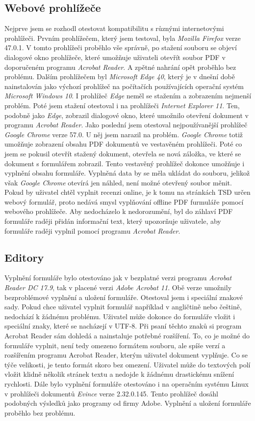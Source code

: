 \documentclass[czech,BP]{thesiskiv}
\begin{document}
\subsection{Webové prohlížeče}
Nejprve jsem se rozhodl otestovat kompatibilitu s různými internetovými prohlížeči. Prvním prohlížečem, který jsem testoval, byla \emph{Mozilla Firefox} verze 47.0.1. V tomto prohlížeči proběhlo vše správně, po stažení souboru se objeví dialogové okno prohlížeče, které umožňuje uživateli otevřít soubor PDF v doporučeném programu \emph{Acrobat Reader}. A zpětné nahrání opět proběhlo bez problému. Dalším prohlížečem byl \emph{Microsoft Edge 40}, který je v dnešní době nainstalován jako výchozí prohlížeč na počítačích používajících operační systém \emph{Microsoft Windows 10}. I prohlížeč \emph{Edge} neměl se stažením a zobrazením nejmenší problém. Poté jsem stažení otestoval i na prohlížeči \emph{Internet Explorer 11}. Ten, podobně jako \emph{Edge}, zobrazil dialogové okno, které umožnilo otevření dokument v programu \emph{Acrobat Reader}. Jako poslední jsem otestoval nejpoužívanější prohlížeč \emph{Google Chrome} verze 57.0. U něj jsem narazil na problém. \emph{Google Chrome} totiž umožňuje zobrazení obsahu PDF dokumentů ve vestavěném prohlížeči. Poté co jsem se pokusil otevřít stažený dokument, otevřela se nová záložka, ve které se dokument s formulářem zobrazil. Tento vestavěný prohlížeč dokonce umožňuje i vyplnění obsahu formuláře. Vyplněná data by se měla ukládat do souboru, jelikož však \emph{Google Chrome} otevírá jen náhled, není možné otevřený soubor měnit. Pokud by uživatel chtěl vyplnit recenzi online, je k tomu na stránkách TSD určen webový formulář, proto nedává smysl vyplňování offline PDF furmuláře pomocí webového prohlížeče. Aby nedocházelo k nedorozumění, byl do záhlaví PDF formuláře raději přidán informační text, který upozorňuje uživatele, aby formuláře raději vyplnil pomocí programu \emph{Acrobat Reader}.
\subsection{Editory}
Vyplnění formuláře bylo otestováno jak v bezplatné verzi programu \emph{Acrobat Reader DC 17.9}, tak v placené verzi \emph{Adobe Acrobat 11}. Obě verze umožnily bezproblémové vyplnění a uložení formuláře. Otestoval jsem i speciální znakové sady. Pokud chce uživatel vyplnit formulář například v angličtině nebo češtině, nedochází k žádnému problému. Uživatel může dokonce do formuláře vložit i speciální znaky, které se nacházejí v UTF-8. Při psaní těchto znaků si program Acrobat Reader sám dohledá a nainstaluje potřebné rozšíření. To, co je možné do formuláře vyplnit, není tedy omezeno formátem souboru, ale spíše verzí a rozšířením programu Acrobat Reader, kterým uživatel dokument vyplňuje. Co se týče velikosti, je tento formát skoro bez omezení. Uživatel může do textových polí vložit klidně několik stránek textu a nedojde k žádnému drastickému snížení rychlosti. Dále bylo vyplnění formuláře otestováno i na operačním systému Linux v prohlížeči dokumentů \emph{Evince} verze 2.32.0.145. Tento prohlížeč dosáhl podobných výsledků jako programy od firmy Adobe. Vyplnění a uložení formuláře proběhlo bez problému.
\end{document}
